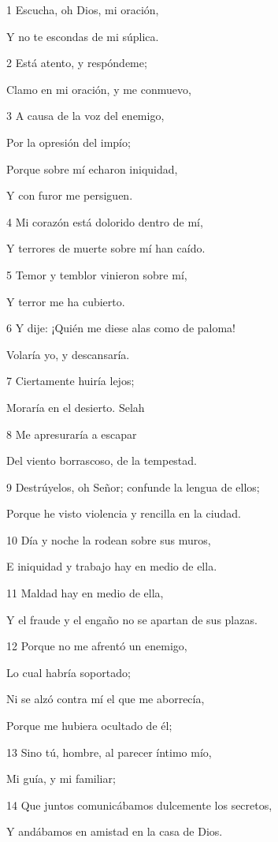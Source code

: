 \par 1 Escucha, oh Dios, mi oración,
\par Y no te escondas de mi súplica.
\par 2 Está atento, y respóndeme;
\par Clamo en mi oración, y me conmuevo,
\par 3 A causa de la voz del enemigo,
\par Por la opresión del impío;
\par Porque sobre mí echaron iniquidad,
\par Y con furor me persiguen.
\par 4 Mi corazón está dolorido dentro de mí,
\par Y terrores de muerte sobre mí han caído.
\par 5 Temor y temblor vinieron sobre mí,
\par Y terror me ha cubierto.
\par 6 Y dije: ¡Quién me diese alas como de paloma!
\par Volaría yo, y descansaría.
\par 7 Ciertamente huiría lejos;
\par Moraría en el desierto. Selah
\par 8 Me apresuraría a escapar
\par Del viento borrascoso, de la tempestad.
\par 9 Destrúyelos, oh Señor; confunde la lengua de ellos;
\par Porque he visto violencia y rencilla en la ciudad.
\par 10 Día y noche la rodean sobre sus muros,
\par E iniquidad y trabajo hay en medio de ella.
\par 11 Maldad hay en medio de ella,
\par Y el fraude y el engaño no se apartan de sus plazas.
\par 12 Porque no me afrentó un enemigo,
\par Lo cual habría soportado;
\par Ni se alzó contra mí el que me aborrecía,
\par Porque me hubiera ocultado de él;
\par 13 Sino tú, hombre, al parecer íntimo mío,
\par Mi guía, y mi familiar;
\par 14 Que juntos comunicábamos dulcemente los secretos,
\par Y andábamos en amistad en la casa de Dios.
